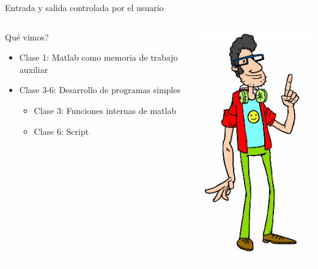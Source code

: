 \documentclass{bredelebeamer}
\begin{document}
\begin{frame}{Entrada y salida controlada por el usuario}
\begin{columns}
\begin{column}{0.5\textwidth}
Qué vimos?
\begin{itemize}
\item Clase 1: Matlab como memoria de trabajo auxiliar
\item Clase 3-6: Desarrollo de programas simples
\begin{itemize}
\item Clase 3: Funciones internas de matlab
\item Clase 6: Script
\end{itemize}
\end{itemize}
\end{column}
\begin{column}{0.5\textwidth}
\begin{center}
\includegraphics[scale=0.3]{images/img42.png}
\end{center}
\end{column}
\end{columns}
\end{frame}
\end{document}

